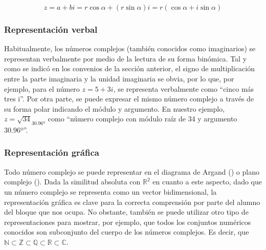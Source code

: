 \documentclass[../main.tex]{memoir}
\begin{document}
$$ z = a + bi = r \cos \alpha + (r \sin \alpha) i = r(\cos \alpha + i \sin \alpha)$$

\subsubsection{Representación verbal}

Habitualmente, los números complejos (también conocidos como imaginarios) se representan verbalmente por medio de la lectura de su forma binómica. Tal y como se indicó en los convenios de la sección anterior, el signo de multiplicación entre la parte imaginaria y la unidad imaginaria se obvia, por lo que, por ejemplo, para el número $z = 5+3i$, se representa verbalmente como ``cinco más tres i''. Por otra parte, se puede expresar el mismo número complejo a través de su forma polar indicando el módulo y argumento. En nuestro ejemplo, $z = \sqrt{34}_{30.96º}$ como ``número complejo con módulo raíz de 34 y argumento 30.96º''.

\subsubsection{Representación gráfica}

Todo número complejo se puede representar en el diagrama de Argand (\cite{argand1971}) o plano complejo (\cite{whittaker1927}). Dada la similitud absoluta con $\mathbb{R}^2$ en cuanto a este aspecto, dado que un número complejo se representa como un vector bidimensional, la representación gráfica es clave para la correcta comprensión por parte del alumno del bloque que nos ocupa. No obstante, también se puede utilizar otro tipo de representaciones para mostrar, por ejemplo, que todos los conjuntos numéricos conocidos son subconjunto del cuerpo de los números complejos. Es decir, que $\mathbb{N} \subset \mathbb{Z} \subset \mathbb{Q} \subset \mathbb{R} \subset \mathbb{C}$. 
\end{document}
